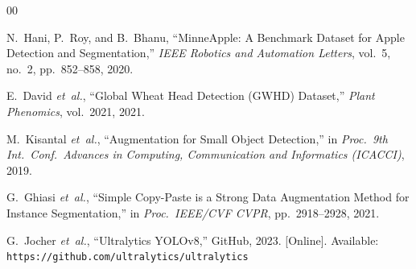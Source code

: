 \documentclass[conference]{IEEEtran}
\begin{document}
\begin{thebibliography}{00}

N.~Hani, P.~Roy, and B.~Bhanu,
``MinneApple: A Benchmark Dataset for Apple Detection and Segmentation,''
\textit{IEEE Robotics and Automation Letters},
vol.~5, no.~2, pp.~852--858, 2020.

E.~David \textit{et~al.},
``Global Wheat Head Detection (GWHD) Dataset,''
\textit{Plant Phenomics}, vol.~2021, 2021.

M.~Kisantal \textit{et~al.},
``Augmentation for Small Object Detection,''
in \textit{Proc.\ 9th Int.\ Conf.\ Advances in Computing,
Communication and Informatics (ICACCI)}, 2019.

G.~Ghiasi \textit{et~al.},
``Simple Copy-Paste is a Strong Data Augmentation Method
for Instance Segmentation,''
in \textit{Proc.\ IEEE/CVF CVPR}, pp.~2918--2928, 2021.

G.~Jocher \textit{et~al.},
``Ultralytics YOLOv8,''
GitHub, 2023. [Online].
Available: \texttt{https://github.com/ultralytics/ultralytics}

\end{thebibliography}
\end{document}

